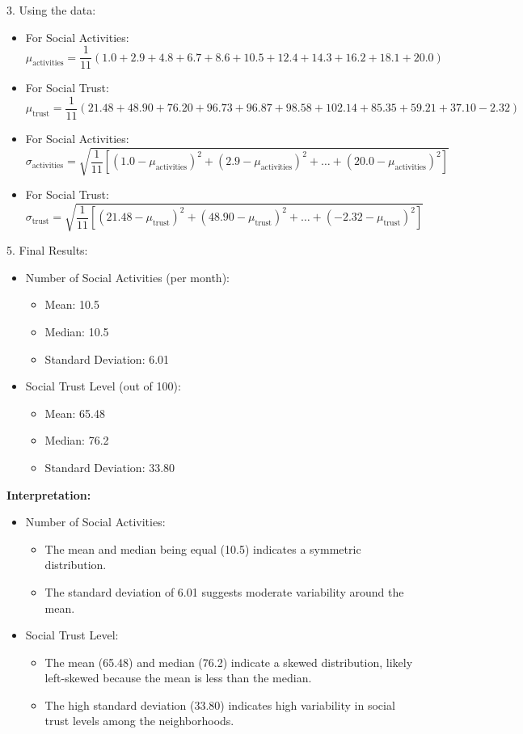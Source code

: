 \documentclass{article}
\begin{document}
3. Using the data:
\begin{itemize}
    \item For Social Activities:
    \[
    \mu_{\text{activities}} = \frac{1}{11} (1.0 + 2.9 + 4.8 + 6.7 + 8.6 + 10.5 + 12.4 + 14.3 + 16.2 + 18.1 + 20.0)
    \]

    \item For Social Trust:
    \[
    \mu_{\text{trust}} = \frac{1}{11} (21.48 + 48.90 + 76.20 + 96.73 + 96.87 + 98.58 + 102.14 + 85.35 + 59.21 + 37.10 - 2.32)
    \]

    \item For Social Activities:
    \[
    \sigma_{\text{activities}} = \sqrt{\frac{1}{11} \left[(1.0 - \mu_{\text{activities}})^2 + (2.9 - \mu_{\text{activities}})^2 + \ldots + (20.0 - \mu_{\text{activities}})^2\right]}
    \]

    \item For Social Trust:
    \[
    \sigma_{\text{trust}} = \sqrt{\frac{1}{11} \left[(21.48 - \mu_{\text{trust}})^2 + (48.90 - \mu_{\text{trust}})^2 + \ldots + (-2.32 - \mu_{\text{trust}})^2\right]}
    \]
\end{itemize}

5. Final Results:
\begin{itemize}
    \item Number of Social Activities (per month):
    \begin{itemize}
        \item Mean: 10.5
        \item Median: 10.5
        \item Standard Deviation: 6.01
    \end{itemize}
    \item Social Trust Level (out of 100):
    \begin{itemize}
        \item Mean: 65.48
        \item Median: 76.2
        \item Standard Deviation: 33.80
    \end{itemize}
\end{itemize}

\textbf{Interpretation:}
\begin{itemize}
    \item Number of Social Activities:
    \begin{itemize}
        \item The mean and median being equal (10.5) indicates a symmetric distribution.
        \item The standard deviation of 6.01 suggests moderate variability around the mean.
    \end{itemize}
    \item Social Trust Level:
    \begin{itemize}
        \item The mean (65.48) and median (76.2) indicate a skewed distribution, likely left-skewed because the mean is less than the median.
        \item The high standard deviation (33.80) indicates high variability in social trust levels among the neighborhoods.
    \end{itemize}
\end{itemize}
\end{document}
